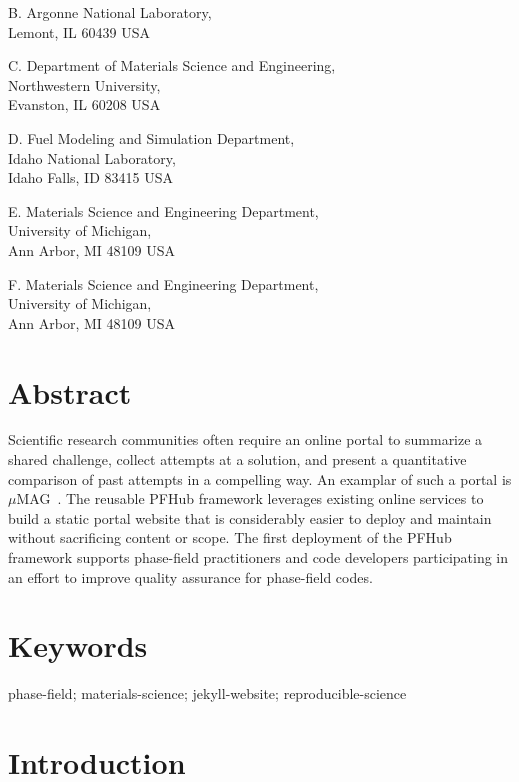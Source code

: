 \documentclass{jors}
\begin{document}
B. Argonne National Laboratory, \\
Lemont, IL 60439 USA

C. Department of Materials Science and Engineering, \\
Northwestern University, \\
Evanston, IL 60208 USA

D. Fuel Modeling and Simulation Department, \\
Idaho National Laboratory, \\
Idaho Falls, ID 83415 USA

E. Materials Science and Engineering Department, \\
University of Michigan, \\
Ann Arbor, MI 48109 USA

F. Materials Science and Engineering Department, \\
University of Michigan, \\
Ann Arbor, MI 48109 USA

\section*{Abstract}

Scientific research communities often require an online portal to
summarize a shared challenge, collect attempts at a solution, and
present a quantitative comparison of past attempts in a compelling
way. An examplar of such a portal is $\mu$MAG~\cite{mumag}. The
reusable PFHub framework leverages existing online services to build a
static portal website that is considerably easier to deploy and
maintain without sacrificing content or scope. The first deployment of
the PFHub framework supports phase-field practitioners and code
developers participating in an effort to improve quality assurance for
phase-field codes.

\section*{Keywords}

phase-field; materials-science; jekyll-website; reproducible-science

\section*{Introduction}
\end{document}
